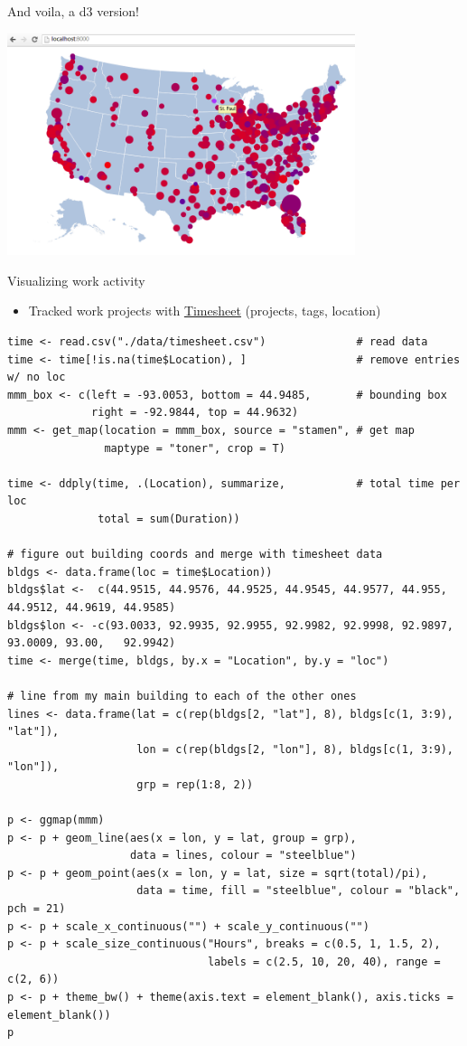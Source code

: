 \documentclass[sans,aspectratio=169,presentation,bigger,fleqn]{beamer}
\begin{document}
\begin{frame}[label=sec-32]{And voila, a d3 version!}
\begin{center}
\includegraphics[height=6.5cm]{./img/transpo-d3.png}
\end{center}
\end{frame}
\begin{frame}[fragile,label=sec-33]{Visualizing work activity}
 \begin{itemize}
\item Tracked work projects with \href{https://play.google.com/store/apps/details?id=com.rauscha.apps.timesheet}{Timesheet} (projects, tags, location)
\end{itemize}

\scriptsize
\begin{verbatim}
time <- read.csv("./data/timesheet.csv")              # read data
time <- time[!is.na(time$Location), ]                 # remove entries w/ no loc
mmm_box <- c(left = -93.0053, bottom = 44.9485,       # bounding box
             right = -92.9844, top = 44.9632)
mmm <- get_map(location = mmm_box, source = "stamen", # get map
               maptype = "toner", crop = T)

time <- ddply(time, .(Location), summarize,           # total time per loc
              total = sum(Duration)) 

# figure out building coords and merge with timesheet data
bldgs <- data.frame(loc = time$Location))
bldgs$lat <-  c(44.9515, 44.9576, 44.9525, 44.9545, 44.9577, 44.955,  44.9512, 44.9619, 44.9585)
bldgs$lon <- -c(93.0033, 92.9935, 92.9955, 92.9982, 92.9998, 92.9897, 93.0009, 93.00,   92.9942)
time <- merge(time, bldgs, by.x = "Location", by.y = "loc")

# line from my main building to each of the other ones
lines <- data.frame(lat = c(rep(bldgs[2, "lat"], 8), bldgs[c(1, 3:9), "lat"]),
                    lon = c(rep(bldgs[2, "lon"], 8), bldgs[c(1, 3:9), "lon"]),
                    grp = rep(1:8, 2))

p <- ggmap(mmm)
p <- p + geom_line(aes(x = lon, y = lat, group = grp),
                   data = lines, colour = "steelblue")
p <- p + geom_point(aes(x = lon, y = lat, size = sqrt(total)/pi),
                    data = time, fill = "steelblue", colour = "black", pch = 21)
p <- p + scale_x_continuous("") + scale_y_continuous("")
p <- p + scale_size_continuous("Hours", breaks = c(0.5, 1, 1.5, 2),
                               labels = c(2.5, 10, 20, 40), range = c(2, 6))
p <- p + theme_bw() + theme(axis.text = element_blank(), axis.ticks = element_blank())
p
\end{verbatim}
\normalsize
\end{frame}
\end{document}
